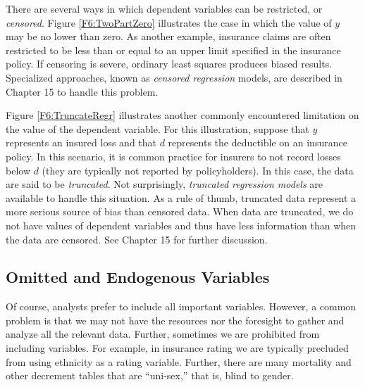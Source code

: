 There are several ways in which dependent variables can be
restricted, or \textit{censored}. Figure \ref{F6:TwoPartZero}
illustrates the case in which the value of $y$ may be no lower than
zero. As another example, insurance claims are often restricted to
be less than or equal to an upper limit specified in the insurance
policy. If censoring is severe, ordinary least squares produces
biased results. Specialized approaches, known as \textit{censored
regression} models, are described in Chapter 15 to handle this
problem.

Figure \ref{F6:TruncateRegr} illustrates another commonly
encountered limitation on the value of the dependent variable. For
this illustration, suppose that $y$ represents an insured loss and
that $d$ represents the deductible on an insurance policy. In this
scenario, it is common practice for insurers to not record losses
below $d$ (they are typically not reported by policyholders). In
this case, the data are said to be \textit{truncated}. Not
surprisingly, \textit{truncated regression models} are available to
handle this situation. As a rule of thumb, truncated data represent
a more serious source of bias than censored data. When data are
truncated, we do not have values of dependent variables and thus
have less information than when the data are censored. See Chapter
15 for further discussion.


\subsection{Omitted and Endogenous Variables}

Of course, analysts prefer to include all important variables.
However, a common problem is that we may not have the resources nor
the foresight to gather and analyze all the relevant data. Further,
sometimes we are prohibited from including variables. For example,
in insurance rating we are typically precluded from using ethnicity
as a rating variable. Further, there are many mortality and other
decrement tables that are ``uni-sex,'' that is, blind to gender.

